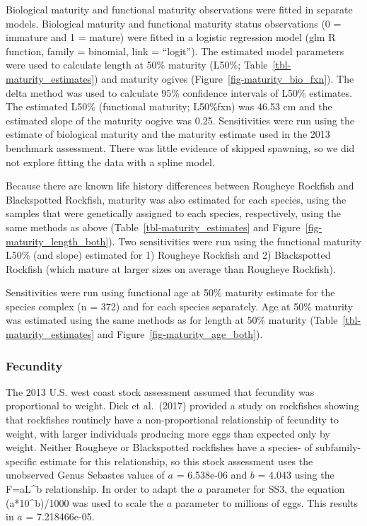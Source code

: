 \documentclass[
]{scrartcl}
\begin{document}
Biological maturity and functional maturity observations were fitted in
separate models. Biological maturity and functional maturity status
observations (0 = immature and 1 = mature) were fitted in a logistic
regression model (glm R function, family = binomial, link = ``logit'').
The estimated model parameters were used to calculate length at 50\%
maturity (L50\%; Table~\ref{tbl-maturity_estimates}) and maturity ogives
(Figure~\ref{fig-maturity_bio_fxn}). The delta method was used to
calculate 95\% confidence intervals of L50\% estimates. The estimated
L50\% (functional maturity; L50\%fxn) was 46.53 cm and the estimated
slope of the maturity oogive was 0.25. Sensitivities were run using the
estimate of biological maturity and the maturity estimate used in the
2013 benchmark assessment. There was little evidence of skipped
spawning, so we did not explore fitting the data with a spline model.

Because there are known life history differences between Rougheye
Rockfish and Blackspotted Rockfish, maturity was also estimated for each
species, using the samples that were genetically assigned to each
species, respectively, using the same methods as above
(Table~\ref{tbl-maturity_estimates} and
Figure~\ref{fig-maturity_length_both}). Two sensitivities were run using
the functional maturity L50\% (and slope) estimated for 1) Rougheye
Rockfish and 2) Blackspotted Rockfish (which mature at larger sizes on
average than Rougheye Rockfish).

Sensitivities were run using functional age at 50\% maturity estimate
for the species complex (n = 372) and for each species separately. Age
at 50\% maturity was estimated using the same methods as for length at
50\% maturity (Table~\ref{tbl-maturity_estimates} and
Figure~\ref{fig-maturity_age_both}).

\subsubsection{Fecundity}\label{fecundity}

The 2013 U.S. west coast stock assessment assumed that fecundity was
proportional to weight. Dick et al.~(2017) provided a study on
rockfishes showing that rockfishes routinely have a non-proportional
relationship of fecundity to weight, with larger individuals producing
more eggs than expected only by weight. Neither Rougheye or Blackspotted
rockfishes have a species- of subfamily-specific estimate for this
relationship, so this stock assessment uses the unobserved Genus
Sebastes values of \(a\) = 6.538e-06 and \(b\) = 4.043 using the
F=aL\^{}b relationship. In order to adapt the \(a\) parameter for SS3,
the equation (a*10\^{}b)/1000 was used to scale the \(a\) parameter to
millions of eggs. This results in \(a\) = 7.218466e-05.
\end{document}
